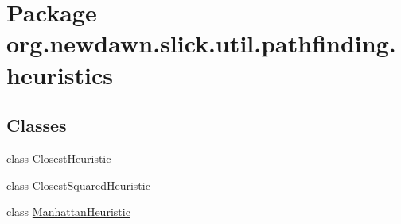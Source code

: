 \hypertarget{namespaceorg_1_1newdawn_1_1slick_1_1util_1_1pathfinding_1_1heuristics}{}\section{Package org.\+newdawn.\+slick.\+util.\+pathfinding.\+heuristics}
\label{namespaceorg_1_1newdawn_1_1slick_1_1util_1_1pathfinding_1_1heuristics}
\subsection*{Classes}
\begin{DoxyCompactItemize}
\item 
class \mbox{\hyperlink{classorg_1_1newdawn_1_1slick_1_1util_1_1pathfinding_1_1heuristics_1_1_closest_heuristic}{Closest\+Heuristic}}
\item 
class \mbox{\hyperlink{classorg_1_1newdawn_1_1slick_1_1util_1_1pathfinding_1_1heuristics_1_1_closest_squared_heuristic}{Closest\+Squared\+Heuristic}}
\item 
class \mbox{\hyperlink{classorg_1_1newdawn_1_1slick_1_1util_1_1pathfinding_1_1heuristics_1_1_manhattan_heuristic}{Manhattan\+Heuristic}}
\end{DoxyCompactItemize}

